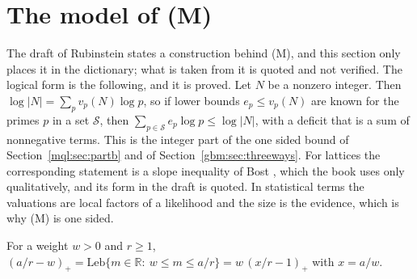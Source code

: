 \section{The model of (M)}\label{lvz:sec:m}

The draft of Rubinstein \cite{Rub26} states a construction behind (M), and this section only places it in the dictionary; what is taken from it is quoted and not verified. The logical form is the following, and it is proved. Let $N$ be a nonzero integer. Then $\log|N|=\sum_pv_p(N)\log p$, so if lower bounds $e_p\le v_p(N)$ are known for the primes $p$ in a set $\mathcal S$, then $\sum_{p\in\mathcal S}e_p\log p\le\log|N|$, with a deficit that is a sum of nonnegative terms. This is the integer part of the one sided bound of Section~\ref{mql:sec:partb} and of Section~\ref{gbm:sec:threeways}. For lattices the corresponding statement is a slope inequality of Bost \cite{Bost95,Bost01}, which the book uses only qualitatively, and its form in the draft is quoted. In statistical terms the valuations are local factors of a likelihood and the size is the evidence, which is why (M) is one sided.

\begin{proposition}\label{lvz:prop:cofactor}
For a weight $w>0$ and $r\ge1$, $(a/r-w)_+=\mathrm{Leb}\{m\in\mathbb R:\ w\le m\le a/r\}=w\,(x/r-1)_+$ with $x=a/w$.
\end{proposition}

